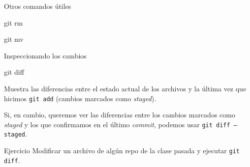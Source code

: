 

\begin{frame}[t]{Otros comandos útiles}
    \begin{comando}
        git rm
    \end{comando}


    \vspace{2em}

    \begin{comando}
        git mv
    \end{comando}

\end{frame}

\begin{frame}[t]{Inspeccionando los cambios}
    \begin{comando}
        git diff
    \end{comando}

    \pause
    \begin{block}{}

        Muestra las diferencias entre el estado actual de los archivos y la última vez que hicimos \texttt{git add} (cambios marcados como \textit{staged}).

        \vspace{.4em}

        Si, en cambio, queremos ver las diferencias entre los cambios marcados como \textit{staged} y los
        que confirmamos en el último \textit{commit}, podemos usar \texttt{git diff --staged}.
    \end{block}

    \pause
    \begin{ejercicio}{Ejercicio}
        Modificar un archivo de algún repo de la clase pasada y ejecutar \texttt{git diff}.
    \end{ejercicio}
\end{frame}

